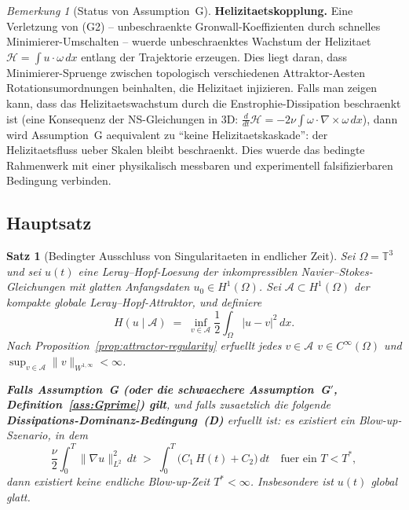 \documentclass[12pt,a4paper]{article}
\theoremstyle{definition}
\theoremstyle{plain}
\newtheorem{theorem}[definition]{Satz}
\theoremstyle{remark}
\newtheorem{remark}[definition]{Bemerkung}
\begin{document}
\begin{remark}[Status von Assumption~G]
\medskip\noindent
\textbf{Helizitaetskopplung.}\;
Eine Verletzung von (G2) -- unbeschraenkte Gronwall-Koeffizienten durch
schnelles Minimierer-Umschalten -- wuerde unbeschraenktes Wachstum der
Helizitaet $\mathcal{H} = \int u \cdot \omega\,dx$ entlang der Trajektorie erzeugen.
Dies liegt daran, dass Minimierer-Spruenge zwischen topologisch verschiedenen
Attraktor-Aesten Rotationsumordnungen beinhalten, die
Helizitaet injizieren. Falls man zeigen kann, dass das Helizitaetswachstum durch die
Enstrophie-Dissipation beschraenkt ist (eine Konsequenz der NS-Gleichungen in 3D:
$\frac{d}{dt}\mathcal{H} = -2\nu\int\omega\cdot\nabla\times\omega\,dx$),
dann wird Assumption~G aequivalent zu ``keine Helizitaetskaskade'':
der Helizitaetsfluss ueber Skalen bleibt beschraenkt. Dies wuerde das
bedingte Rahmenwerk mit einer physikalisch messbaren und
experimentell falsifizierbaren Bedingung verbinden.
\end{remark}

\subsection*{Hauptsatz}
\begin{theorem}[Bedingter Ausschluss von Singularitaeten in endlicher Zeit]
\label{thm:main}
Sei $\Omega = \mathbb{T}^3$ und sei $u(t)$ eine Leray--Hopf-Loesung der
inkompressiblen Navier--Stokes-Gleichungen mit glatten Anfangsdaten
$u_0 \in H^1(\Omega)$. Sei $\mathcal{A} \subset H^1(\Omega)$ der kompakte globale
Leray--Hopf-Attraktor, und definiere
\[
    H\!\left(u\mid\mathcal{A}\right)
    \;=\; \inf_{v\in\mathcal{A}}\frac{1}{2}\int_\Omega |u-v|^2\,dx.
\]
Nach Proposition~\ref{prop:attractor-regularity} erfuellt jedes $v \in \mathcal{A}$
$v \in C^\infty(\Omega)$ und $\sup_{v\in\mathcal{A}}\|v\|_{W^{1,\infty}} < \infty$.

\textbf{Falls Assumption~G \textup{(}oder die schwaechere
Assumption~G$'$, Definition~\ref{ass:Gprime}\textup{)} gilt},
und falls zusaetzlich die folgende \textbf{Dissipations-Dominanz-Bedingung~(D)} erfuellt ist: es existiert ein Blow-up-Szenario, in dem
\begin{equation}\label{eq:diss-dom}
  \frac{\nu}{2}\int_0^T \|\nabla u\|_{L^2}^2\,dt
  \;>\;
  \int_0^T \bigl(C_1\,H(t) + C_2\bigr)\,dt
  \quad \text{fuer ein } T < T^*,
  \tag{D}
\end{equation}
dann existiert keine endliche Blow-up-Zeit $T^* < \infty$. Insbesondere ist
$u(t)$ global glatt.
\end{theorem}
\end{document}
